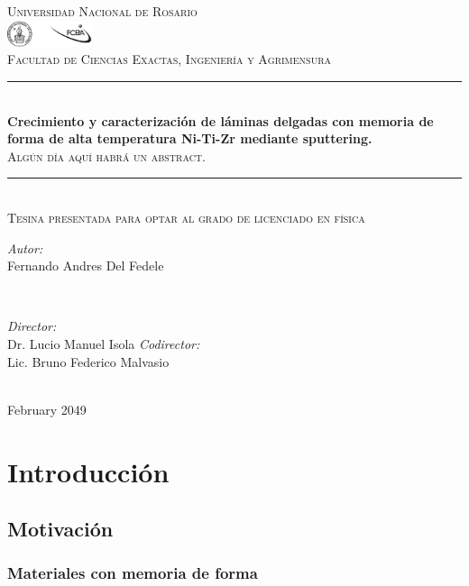 \documentclass[12pt]{article}
\title{\thesistitle}
\author{\thesisauthorfirst\space\thesisauthorsecond}
\date{\thesisdate}
\def\thesistitle{Crecimiento y caracterización de láminas delgadas con memoria de
forma de alta temperatura Ni-Ti-Zr mediante sputtering.}
\def\thesissubtitle{Algún día aquí habrá un abstract.}
\def\thesisauthorfirst{Fernando Andres Del Fedele}
\def\thesissupervisorfirst{Dr. Lucio Manuel Isola}
\def\thesissupervisorsecond{Lic. Bruno Federico Malvasio}
\def\thesisdate{February 2049}
\theoremstyle{definition}
\theoremstyle{remark}
\begin{document}
\begin{titlepage}
	\thispagestyle{empty}
	\newcommand{\HRule}{\rule{\linewidth}{0.5mm}}
	\center
	\textsc{\Large Universidad Nacional de Rosario}\\[.7cm]
	\includegraphics[width=25mm]{img/fceia.jpg}\\[.5cm]
	\textsc{Facultad de Ciencias Exactas, Ingeniería y Agrimensura}\\[0.5cm]
	
	\HRule \\[0.4cm]
	{ \huge \bfseries \thesistitle}\\[0.1cm]
	\textsc{\thesissubtitle}\\
	\HRule \\[.5cm]
	\textsc{\large Tesina presentada para optar al grado de licenciado en física}\\[.5cm]
	
	\begin{minipage}{0.4\textwidth}
	\begin{flushleft} \large
	\emph{Autor:}\\
	\thesisauthorfirst\space
	\end{flushleft}
	\end{minipage}
	~
	\begin{minipage}{0.4\textwidth}
	\begin{flushright} \large
	\emph{Director:} \\
	\thesissupervisorfirst\space
	\emph{Codirector:} \\
	\thesissupervisorsecond\space
	\end{flushright}
	\end{minipage}\\[4cm]
	\vfill
	{\large \thesisdate}\\
	\clearpage
\end{titlepage}

\tableofcontents

\newpage
\section{Introducción}

\subsection{Motivación}

\subsubsection{Materiales con memoria de forma}
\end{document}
